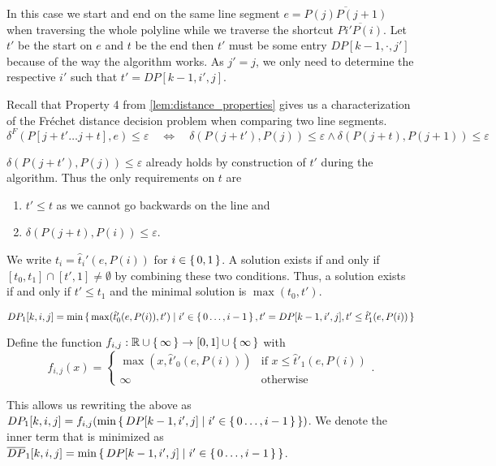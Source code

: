 In this case we start and end on the same line segment \(e = \overline{P(j)P(j+1)}\) when traversing the whole polyline while we traverse the shortcut \(\overline{P{i'}P(i)}\). Let \(t'\) be the start on \(e\) and \(t\) be the end then \(t'\) must be some entry \(DP[k-1, \cdot, j']\) because of the way the algorithm works. As \(j' = j\), we only need to determine the respective \(i'\) such that \(t' = DP[k-1, i', j]\).

Recall that Property 4 from \cref{lem:distance_properties} gives us a characterization of the Fréchet distance decision problem when comparing two line segments. 
	\[\delta^F(P[j + t' \dots j + t], e) \leq \varepsilon \quad \iff \quad \delta(P(j+t'), P(j)) \leq \varepsilon \land \delta(P(j+t), P(j+1)) \leq \varepsilon\]
	
\(\delta(P(j+t'), P(j)) \leq \varepsilon\) already holds by construction of \(t'\) during the algorithm. Thus the only requirements on \(t\) are 
\begin{enumerate}
	\item \(t' \leq t\) as we cannot go backwards on the line and 
	\item \(\delta(P(j + t), P(i)) \leq \varepsilon\).  
\end{enumerate}

We write \(t_i = \hat t_i'(e, P(i))\) for \(i \in \set{0, 1}\). A solution exists if and only if \([t_0, t_1] \cap [t', 1] \neq \emptyset\) by combining these two conditions. Thus, a solution exists if and only if \(t' \leq t_1 \) and the minimal solution is \(\max(t_0, t')\). 

\begin{observation}
	\(DP_1[k, i, j] = \min \set{ \max(\hat t'_0(e, P(i)), t') \mid i' \in \set{0 \dots, i - 1}, t' = DP[k-1, i', j], t' \leq \hat t_1'(e, P(i)) }\)
\end{observation}

Define the function \(f_{i,j}: \mathbb{R} \cup \set{\infty} \to [0, 1] \cup \set{\infty}\) with 
	\[f_{i,j}(x) = 
	\begin{cases}
		\max(x, \hat t'_0(e, P(i))) &\textrm{if } x \leq \hat t'_1(e, P(i)) \\
		\infty &\textrm{otherwise}
	\end{cases}.\]
	
This allows us rewriting the above as \(DP_1[k, i, j] = f_{i, j}(\min \set{DP[k-1, i', j] \mid i' \in \set{0 \dots, i - 1} })\). We denote the inner term that is minimized as \(\overline{DP}_1[k,i,j] = \min \set{DP[k-1, i', j] \mid i' \in \set{0 \dots, i - 1}}\). 

